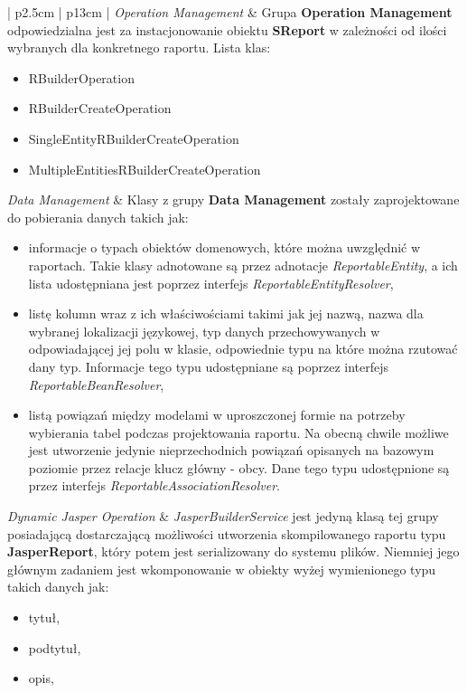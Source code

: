 \begin{center}
\begin{longtable}{| p{2.5cm} | p{13cm} |}
					\emph{Operation Management} 									& 
					Grupa \textbf{Operation Management} odpowiedzialna jest za instacjonowanie obiektu \textbf{SReport} w zależności
					od ilości wybranych dla konkretnego raportu. Lista klas:
					\begin{itemize}
						\item RBuilderOperation
						\item RBuilderCreateOperation
						\item SingleEntityRBuilderCreateOperation
						\item MultipleEntitiesRBuilderCreateOperation
					\end{itemize}					
					\hline
					\emph{Data Management}											&
					Klasy z grupy \textbf{Data Management} zostały zaprojektowane do pobierania danych takich jak:
					\begin{itemize}
						\item informacje o typach obiektów domenowych, które można uwzględnić w raportach. Takie klasy adnotowane są 
						przez adnotacje \emph{\@{}ReportableEntity}, a ich lista udostępniana jest poprzez interfejs \emph{ReportableEntityResolver},
						\item listę kolumn wraz z ich właściwościami takimi jak jej nazwą, nazwa dla wybranej lokalizacji językowej, typ danych
						przechowywanych w odpowiadającej jej polu w klasie, odpowiednie typu na które można rzutować dany typ. Informacje tego 
						typu udostępniane są poprzez interfejs \emph{ReportableBeanResolver},
						\item listą powiązań między modelami w uproszczonej formie na potrzeby wybierania tabel podczas projektowania raportu. 
						Na obecną chwile możliwe jest utworzenie jedynie nieprzechodnich powiązań opisanych na bazowym poziomie przez relacje
						klucz główny - obcy. Dane tego typu udostępnione są przez interfejs \emph{ReportableAssociationResolver}. 
					\end{itemize}
					\hline
					\emph{Dynamic Jasper Operation}								&
					\emph{JasperBuilderService} jest jedyną klasą tej grupy posiadającą dostarczającą możliwości utworzenia skompilowanego
					raportu typu \textbf{JasperReport}, który potem jest serializowany do systemu plików. Niemniej jego głównym zadaniem
					jest wkomponowanie w obiekty wyżej wymienionego typu takich danych jak:
					\begin{itemize}
						\item tytuł,
						\item podtytuł,
						\item opis,

\end{itemize}
\end{longtable}
\end{center}
